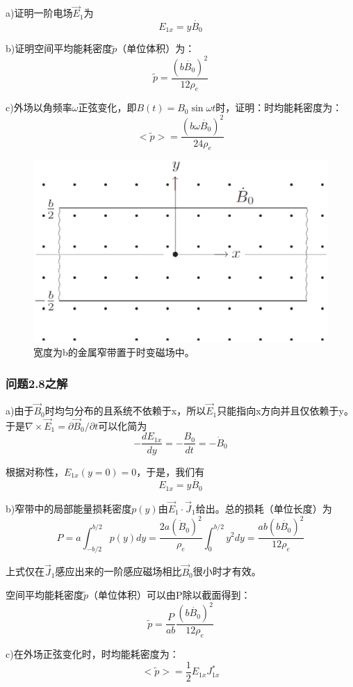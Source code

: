 a)证明一阶电场$\vec{E}_1$为
$$E_{1x}=y\dot{B_0}$$

b)证明空间平均能耗密度$\tilde{p}$（单位体积）为：
$$\tilde{p}=\frac{(b\dot{B_0})^2}{12\rho_e}$$

c)外场以角频率$\omega$正弦变化，即$B(t)=B_0 \sin\omega t$时，证明：时均能耗密度为：
$$<\tilde{p}>=\frac{(b\omega\dot{B_0})^2}{24\rho_e}$$

\begin{figure}
  \centering
 \includegraphics[scale=0.4]{chpt2/figs/fig2.13.eps}
  \caption{宽度为b的金属窄带置于时变磁场中。}
\end{figure}

\subsubsection{问题2.8之解}
a)由于$\vec{B}_0$时均匀分布的且系统不依赖于x，所以$\vec{E}_1$只能指向x方向并且仅依赖于y。于是$\nabla\times \vec{E}_1=\partial \vec{B}_0/\partial t$可以化简为
$$-\frac{dE_{1x}}{dy}=-\frac{B_0}{dt}=-\dot{B}_0$$

根据对称性，$E_{1x}(y=0)=0$，于是，我们有
$$E_{1x}=y\dot{B_0}$$

b)窄带中的局部能量损耗密度$p(y)$由$\vec{E}_1\cdot\vec{J}_1$给出。总的损耗（单位长度）为
$$P=a\int_{-b/2}^{b/2}p(y)dy=\frac{2a(\dot{B}_0)^2}{\rho_e}\int_{0}^{b/2}y^2dy=\frac{ab(b\dot{B_0})^2}{12\rho_e}$$

上式仅在$\vec{J}_1$感应出来的一阶感应磁场相比$\vec{B}_0$很小时才有效。

空间平均能耗密度$\tilde{p}$（单位体积）可以由P除以截面得到：
$$\tilde{p}=\frac{P}{ab}\frac{(b\dot{B_0})^2}{12\rho_e}$$

c)在外场正弦变化时，时均能耗密度为：
$$<\tilde{p}>=\frac{1}{2}E_{1x} J_{1x}^*$$

